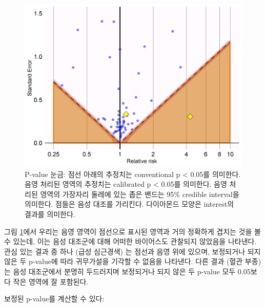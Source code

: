 \documentclass[11pt]{book}
\newenvironment{Shaded}{\begin{snugshade}}{\end{snugshade}}
\newcommand{\KeywordTok}[1]{\textcolor[rgb]{0.13,0.29,0.53}{\textbf{#1}}}
\newcommand{\DataTypeTok}[1]{\textcolor[rgb]{0.13,0.29,0.53}{#1}}
\newcommand{\StringTok}[1]{\textcolor[rgb]{0.31,0.60,0.02}{#1}}
\newcommand{\OperatorTok}[1]{\textcolor[rgb]{0.81,0.36,0.00}{\textbf{#1}}}
\newcommand{\NormalTok}[1]{#1}
\theoremstyle{definition}
\theoremstyle{definition}
\theoremstyle{definition}
\theoremstyle{remark}
\begin{document}
\begin{figure}

{\centering \includegraphics[width=0.7\linewidth]{images/MethodValidity/pValueCal} 

}

\caption{P-value 눈금: 점선 아래의 추정치는 conventional p < 0.05를 의미한다. 음영 처리된 영역의 추정치는 calibrated p < 0.05를 의미한다. 음영 처리된 영역의 가장자리 둘레에 있는 좁은 밴드는 95\% credible interval을 의미한다. 점들은 음성 대조를 가리킨다. 다이아몬드 모양은 interest의 결과를 의미한다.}\label{fig:pValueCal}
\end{figure}

그림 \ref{fig:pValueCal}에서 우리는 음영 영역이 점선으로 표시된 영역과
거의 정확하게 겹치는 것을 볼 수 있는데, 이는 음성 대조군에 대해 어떠한
바이어스도 관찰되지 않았음을 나타낸다. 관심 있는 결과 중 하나 (급성
심근경색) 는 점선과 음영 위에 있으며, 보정되거나 되지 않은 두 p-value에
따라 귀무가설을 기각할 수 없음을 나타낸다. 다른 결과 (혈관 부종) 는 음성
대조군에서 분명히 두드러지며 보정되거나 되지 않은 두 p-value 모두
0.05보다 작은 영역에 잘 포함된다.

보정된 p-value를 계산할 수 있다:

\begin{Shaded}
\end{Shaded}
\end{document}
